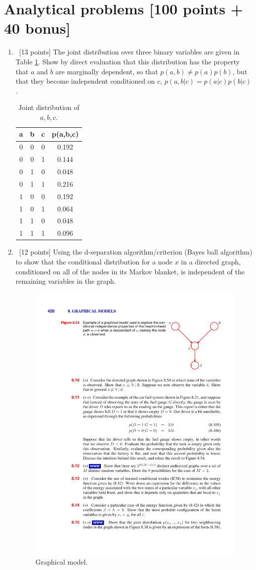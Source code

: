 \documentclass[12pt, fullpage,letterpaper]{article}
\begin{document}
\section*{Analytical problems [100 points + 40 bonus]}	
\label{sec:q1}
\begin{enumerate}
\item~[13 points] The joint distribution over three binary variables are given in Table \ref{tb:abc}. Show by direct evaluation that this distribution has the property that $a$ and $b$ are marginally dependent, so that $p(a, b) \neq p(a)p(b)$, but that they become independent conditioned on $c$, \ie  $p(a,b|c) = p(a|c)p(b|c)$. 
\begin{table}
	\centering
	\begin{tabular}{c|c|c|c}
		\hline
		a & b & c  & p(a,b,c)\\
		\hline
		0 & 0 & 0 & 0.192\\
		0 & 0 & 1 & 0.144\\
		0 & 1 & 0 & 0.048\\
		0 & 1 & 1 & 0.216\\
	    1 & 0 & 0 & 0.192\\
	    1 & 0 & 1  & 0.064\\
	    1 & 1 & 0 & 0.048\\
	    1 & 1 & 1 & 0.096\\
	    \hline
	\end{tabular}
\caption{Joint distribution of $a,b,c$.} \label{tb:abc}
\end{table}

\item~[12 points] Using the d-separation algorithm/criterion (Bayes ball algorithm) to show that the conditional distribution for a node $x$ in a directed graph, conditioned on all of the nodes in its Markov blanket, is independent of the remaining variables in the graph.



\begin{figure}[h]
\centering
\includegraphics[width=0.3\linewidth]{./fig1.pdf} 
\caption{Graphical model.} \label{fig:graph}
\end{figure}


\end{enumerate}
\end{document}
